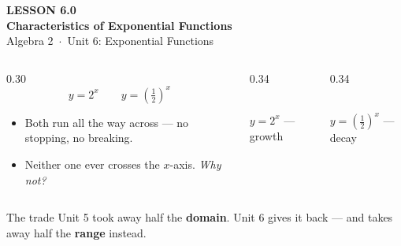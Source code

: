 \documentclass[aspectratio=169, 11pt]{beamer}
\newcommand{\lgrid}[4]{%
  \draw[step=1, linegray!45, thin] (#1,#3) grid (#2,#4);
  \draw[->, thick, charcoal] (#1,0)--(#2,0) node[below right, font=\tiny]{$x$};
  \draw[->, thick, charcoal] (0,#3)--(0,#4) node[left, font=\tiny]{$y$};}
\newcommand{\expcurve}[4]{\draw[very thick, forest, domain=#3:#4, samples=120, smooth]
  plot (\x,{#1*exp((#2)*(\x))});}
\begin{document}
{
\begin{frame}[plain]
  \vspace{2.8cm}\hspace{0.55cm}%
  \begin{minipage}{0.9\textwidth}
    {\color{goldacc}\bfseries\small LESSON 6.0}\\[0.5cm]
    {\color{white}\bfseries\LARGE Characteristics of Exponential Functions}\\[1.2cm]
    {\color{forestmid}\small Algebra 2~$\cdot$~Unit 6: Exponential Functions}
  \end{minipage}
\end{frame}
}

\begin{frame}[t, plain]
  \begin{columns}[T]
    \begin{column}{0.30\textwidth}
      \[ y = 2^{x} \qquad y=\left(\tfrac12\right)^{x} \]
      \begin{itemize}\setlength{\itemsep}{4pt}
        \item Both run all the way across --- no stopping, no breaking.
        \item Neither one ever crosses the $x$-axis. \emph{Why not?}
      \end{itemize}
    \end{column}
    \begin{column}{0.34\textwidth}
      \centering
      \\[2pt]
      {\footnotesize $y=2^{x}$ --- growth}
    \end{column}
    \begin{column}{0.34\textwidth}
      \centering
      \\[2pt]
      {\footnotesize $y=\left(\tfrac12\right)^{x}$ --- decay}
    \end{column}
  \end{columns}
  \vspace{2pt}
  \begin{block}{The trade}
    Unit 5 took away half the \textbf{domain}. Unit 6 gives it back --- and takes away half the
    \textbf{range} instead.
  \end{block}
\end{frame}
\end{document}
